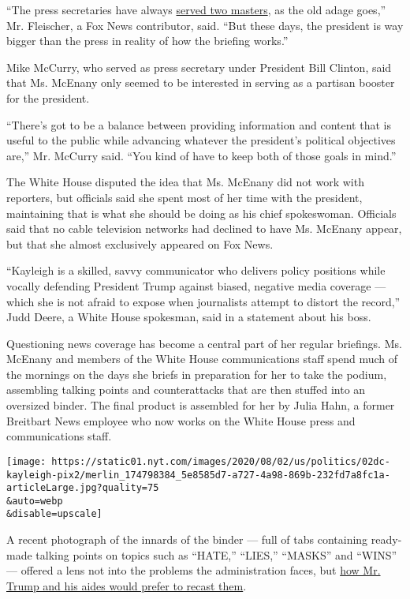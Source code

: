 ``The press secretaries have always
\href{https://www.nytimes.com/2001/01/22/us/public-lives-careful-steps-took-press-secretary-to-the-white-house.html}{served
two masters}, as the old adage goes,'' Mr. Fleischer, a Fox News
contributor, said. ``But these days, the president is way bigger than
the press in reality of how the briefing works.''

Mike McCurry, who served as press secretary under President Bill
Clinton, said that Ms. McEnany only seemed to be interested in serving
as a partisan booster for the president.

``There's got to be a balance between providing information and content
that is useful to the public while advancing whatever the president's
political objectives are,'' Mr. McCurry said. ``You kind of have to keep
both of those goals in mind.''

The White House disputed the idea that Ms. McEnany did not work with
reporters, but officials said she spent most of her time with the
president, maintaining that is what she should be doing as his chief
spokeswoman. Officials said that no cable television networks had
declined to have Ms. McEnany appear, but that she almost exclusively
appeared on Fox News.

``Kayleigh is a skilled, savvy communicator who delivers policy
positions while vocally defending President Trump against biased,
negative media coverage --- which she is not afraid to expose when
journalists attempt to distort the record,'' Judd Deere, a White House
spokesman, said in a statement about his boss.

Questioning news coverage has become a central part of her regular
briefings. Ms. McEnany and members of the White House communications
staff spend much of the mornings on the days she briefs in preparation
for her to take the podium, assembling talking points and counterattacks
that are then stuffed into an oversized binder. The final product is
assembled for her by Julia Hahn, a former Breitbart News employee who
now works on the White House press and communications staff.

\texttt{[image: https://static01.nyt.com/images/2020/08/02/us/politics/02dc-kayleigh-pix2/merlin\_174798384\_5e8585d7-a727-4a98-869b-232fd7a8fc1a-articleLarge.jpg?quality=75\\\&auto=webp\\\&disable=upscale]}

A recent photograph of the innards of the binder --- full of tabs
containing ready-made talking points on topics such as ``HATE,''
``LIES,'' ``MASKS'' and ``WINS'' --- offered a lens not into the
problems the administration faces, but
\href{https://www.washingtonpost.com/politics/2020/07/17/heres-what-kayleigh-mcenany-would-like-talk-about/}{how
Mr. Trump and his aides would prefer to recast them}.

